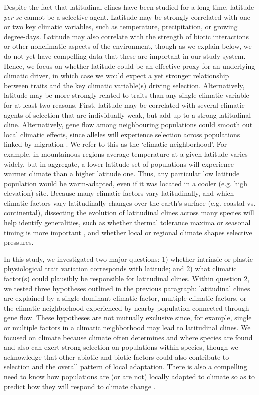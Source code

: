 \documentclass[11pt, oneside]{article}
\begin{document}
Despite the fact that latitudinal clines have been studied for a long time, latitude \textit{per se} cannot be a selective agent. Latitude may be strongly correlated with one or two key climatic variables, such as temperature, precipitation, or growing degree-days. Latitude may also correlate with the strength of biotic interactions \citep{Schemske_etal_2009} or other nonclimatic aspects of the environment, though as we explain below, we do not yet have compelling data that these are important in our study system. Hence, we focus on whether latitude could be an effective proxy for an underlying climatic driver, in which case we would expect a yet stronger relationship between traits and the key climatic variable(s) driving selection. Alternatively, latitude may be more strongly related to traits than any single climatic variable for at least two reasons. First, latitude may be correlated with several climatic agents of selection that are individually weak, but add up to a strong latitudinal cline. Alternatively, gene flow among neighbouring populations could smooth out local climatic effects, since alleles will experience selection across populations linked by migration \citep{Slatkin_1978, Paul_etal_2011, Hadfield_2016}. We refer to this as the `climatic neighborhood'. For example, in mountainous regions average temperature at a given latitude varies widely, but in aggregate, a lower latitude set of populations will experience warmer climate than a higher latitude one. Thus, any particular low latitude population would be warm-adapted, even if it was located in a cooler (e.g. high elevation) site. Because many climatic factors vary latitudinally, and which climatic factors vary latitudinally changes over the earth's surface (e.g. coastal vs. continental), dissecting the evolution of latitudinal clines across many species will help identify generalities, such as whether thermal tolerance maxima or seasonal timing is more important \citep{Bradshaw_Holzapfel_2008}, and whether local or regional climate shapes selective pressures.

In this study, we investigated two major questions: 1) whether intrinsic or plastic physiological trait variation corresponds with latitude; and 2) what climatic factor(s) could plausibly be responsible for latitudinal clines. Within question 2, we tested three hypotheses outlined in the previous paragraph: latitudinal clines are explained by a single dominant climatic factor, multiple climatic factors, or the climatic neighborhood experienced by nearby population connected through gene flow. These hypotheses are not mutually exclusive since, for example, single or multiple factors in a climatic neighborhood may lead to latitudinal clines. We focused on climate because climate often determines and where species are found and also can exert strong selection on populations within species, though we acknowledge that other abiotic and biotic factors could also contribute to selection and the overall pattern of local adaptation. There is also a compelling need to know how populations are (or are not) locally adapted to climate so as to predict how they will respond to climate change \citep{Aitken_Whitlock_2013}. 
\end{document}
